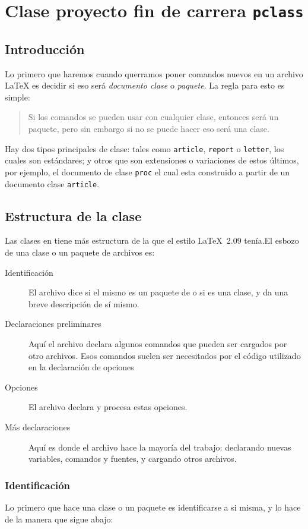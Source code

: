 
\chapter{Clase proyecto fin de carrera \texttt{pclass}}\label{clasepfc}
\section{Introducción}

Lo primero que haremos cuando querramos poner comandos nuevos en un archivo  \LaTeX{} es decidir si eso será \emph{documento clase} o \emph{paquete}. La regla para esto es simple:
\begin{quote}
  Si los comandos se pueden usar con cualquier clase, entonces será un paquete, pero sin embargo si no se puede hacer eso será una clase.
\end{quote}

Hay dos tipos principales de clase: tales como \verb|article|, \verb|report| o
\verb|letter|, los cuales son estándares; y otros que son extensiones o variaciones de estos últimos, por ejemplo, el documento de clase \verb|proc| el cual esta construido a partir de un documento clase \verb|article|.


	
\section{Estructura de la clase}
Las clases en \LaTeXe{} tiene más estructura de la que el estilo \LaTeX~2.09 tenía.El esbozo de una clase o un paquete de archivos es:
\begin{description}
\item[Identificación] El archivo dice si el mismo es un paquete de \LaTeXe{} o si es una clase,  y da una breve descripción de sí mismo.
\item[Declaraciones preliminares]
Aquí el archivo declara algunos comandos que pueden ser cargados por otro archivos. Esos comandos suelen ser necesitados por el código utilizado en la declaración de opciones
\item[Opciones] El archivo declara y procesa estas opciones.
\item[Más declaraciones] Aquí es donde el archivo hace la mayoría del trabajo: declarando nuevas variables, comandos y fuentes, y cargando otros archivos.
\end{description}
 
\subsection{Identificación}
Lo primero que hace una clase o un paquete es identificarse a si misma, y lo hace de la manera que sigue abajo:

